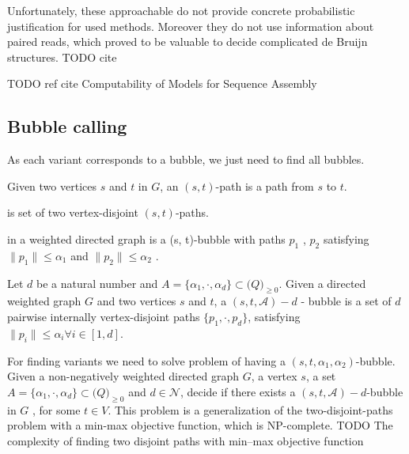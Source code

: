 Unfortunately, these approachable do not provide concrete probabilistic justification for used methods. 
Moreover they do not use information about paired reads, which proved to be valuable to decide complicated de Bruijn structures. TODO cite
 
TODO ref cite Computability of Models for Sequence Assembly

\subsection{Bubble calling}
As each variant corresponds to a bubble, we just need to find all bubbles. 

\begin{definicia}[$(s, t)$ -path]
Given two vertices $s$ and $t$ in $G$, an $(s, t)$-path is a path from $s$ to $t$. 
\end{definicia}

\begin{definicia}[$(s, t)$ -bubble]
is set of two vertex-disjoint $(s,t)$-paths. 
\end{definicia}


\begin{definicia}
in a weighted directed graph is a (s, t)-bubble with paths $p_{1}$ , $p_{2}$ 
satisfying $\| p_{1} \| \leq \alpha_{1}$ and $\| p_{2} \| \leq \alpha_{2}$ .
\end{definicia}

\begin{definicia} 
Let $d$ be a natural number and $A = \{\alpha_1 ,\cdot , \alpha_d \} \subset \mathcal(Q)_{\geq 0}$. 
Given a directed weighted graph $G$ and two vertices $s$ and $t$, 
a $(s, t, \mathcal{A})- d$ - bubble is a set of $d$ pairwise internally vertex-disjoint paths $\{p_1 , \cdot, p_d \}$, 
satisfying $\|p_i\| \leq \alpha_i \forall i \in [1, d]$.
\end{definicia}

For finding variants we need to solve problem of having a $(s, t, \alpha_1, \alpha_2)$-bubble.
Given a non-negatively weighted directed graph $G$, a vertex $s$,
a set $A = \{\alpha_1 ,\cdot , \alpha_d \} \subset \mathcal(Q)_{\geq 0}$ and $d \in \mathcal{N}$, decide if there exists a $(s, t, \mathcal{A})-d$-bubble in $G$ , for some $t \in V$.
This problem is a generalization of the two-disjoint-paths problem with a min-max objective function, which is NP-complete. TODO The complexity of finding two disjoint paths with min–max objective function

